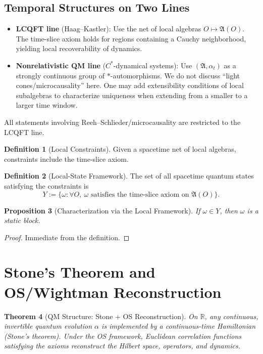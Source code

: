 \documentclass[11pt]{article}
\newtheorem{theorem}{Theorem}[section]
\newtheorem{proposition}[theorem]{Proposition}
\theoremstyle{definition}
\newtheorem{definition}[theorem]{Definition}
\theoremstyle{remark}
\begin{document}
\subsection{Temporal Structures on Two Lines}

\begin{itemize}
\item \textbf{LCQFT line} (Haag--Kastler): Use the net of local algebras \( O\mapsto\mathfrak{A}(O) \). The time-slice axiom holds for regions containing a Cauchy neighborhood, yielding local recoverability of dynamics.
\item \textbf{Nonrelativistic QM line} (\( C^* \)-dynamical systems): Use \( (\mathfrak{A},\alpha_t) \) as a strongly continuous group of \( * \)-automorphisms. We do not discuss ``light cones/microcausality'' here. One may add extensibility conditions of local subalgebras to characterize uniqueness when extending from a smaller to a larger time window.
\end{itemize}

All statements involving Reeh--Schlieder/microcausality are restricted to the LCQFT line.

\begin{definition}[Local Constraints]\label{def:constraints}
Given a spacetime net of local algebras, constraints include the time-slice axiom.
\end{definition}

\begin{definition}[Local-State Framework]\label{def:framework}
The set of all spacetime quantum states satisfying the constraints is
\[
Y := \{\omega: \forall O,\ \omega \text{ satisfies the time-slice axiom on } \mathfrak{A}(O)\}.
\]
\end{definition}

\begin{proposition}[Characterization via the Local Framework]\label{prop:framework}
If \( \omega\in Y \), then \( \omega \) is a static block.
\end{proposition}

\begin{proof}
Immediate from the definition.
\end{proof}

\section{Stone's Theorem and OS/Wightman Reconstruction}\label{sec:stone}

\begin{theorem}[QM Structure: Stone + OS Reconstruction]\label{thm:stone}
On \( \mathbb{R} \), any continuous, invertible quantum evolution \( \alpha \) is implemented by a continuous-time Hamiltonian (Stone's theorem). Under the OS framework, Euclidean correlation functions satisfying the axioms reconstruct the Hilbert space, operators, and dynamics.
\end{theorem}
\end{document}
